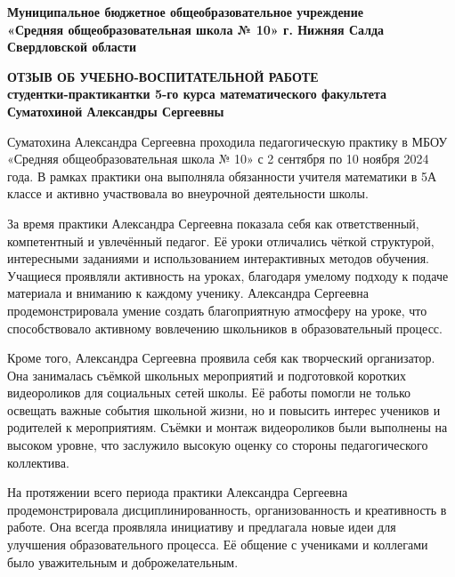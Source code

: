 \documentclass[a4paper,12pt]{article}
\begin{document}
\begin{center}
\textbf{Муниципальное бюджетное общеобразовательное учреждение}\\
\textbf{«Средняя общеобразовательная школа № 10» г. Нижняя Салда Свердловской области}\\
\end{center}

\begin{center}
\textbf{\large ОТЗЫВ ОБ УЧЕБНО-ВОСПИТАТЕЛЬНОЙ РАБОТЕ}\\
\textbf{студентки-практикантки 5-го курса математического факультета}\\
\textbf{Суматохиной Александры Сергеевны}
\end{center}

\vspace{10mm}

Суматохина Александра Сергеевна проходила педагогическую практику в МБОУ «Средняя общеобразовательная школа № 10» с 2 сентября по 10 ноября 2024 года. В рамках практики она выполняла обязанности учителя математики в 5А классе и активно участвовала во внеурочной деятельности школы.

За время практики Александра Сергеевна показала себя как ответственный, компетентный и увлечённый педагог. Её уроки отличались чёткой структурой, интересными заданиями и использованием интерактивных методов обучения. Учащиеся проявляли активность на уроках, благодаря умелому подходу к подаче материала и вниманию к каждому ученику. Александра Сергеевна продемонстрировала умение создать благоприятную атмосферу на уроке, что способствовало активному вовлечению школьников в образовательный процесс.

Кроме того, Александра Сергеевна проявила себя как творческий организатор. Она занималась съёмкой школьных мероприятий и подготовкой коротких видеороликов для социальных сетей школы. Её работы помогли не только освещать важные события школьной жизни, но и повысить интерес учеников и родителей к мероприятиям. Съёмки и монтаж видеороликов были выполнены на высоком уровне, что заслужило высокую оценку со стороны педагогического коллектива.

На протяжении всего периода практики Александра Сергеевна продемонстрировала дисциплинированность, организованность и креативность в работе. Она всегда проявляла инициативу и предлагала новые идеи для улучшения образовательного процесса. Её общение с учениками и коллегами было уважительным и доброжелательным.

\vspace{5mm}
\end{document}
